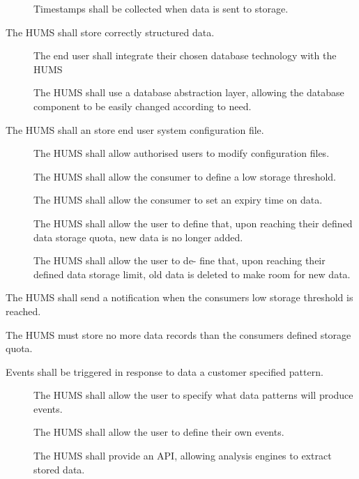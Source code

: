 \begin{description}
\begin{description}
 		 \item[] Timestamps shall be collected when data is sent 	
		to storage.
	\end{description}
	 \item[\fr{3}] The HUMS shall store correctly structured data.
	 \begin{description}
	 	\item[] The end user shall integrate their chosen database 
			technology with the HUMS
	 	\item[] The HUMS shall use a database abstraction layer, 
			allowing the database component to be easily changed 
according to 			need.
	  \end{description}
	 \item[\fr{4}] The HUMS shall an store end user system configuration 
			file.
	 \begin{description}
	  	\item[] The HUMS shall allow authorised users to modify
 		configuration files. 
		 \item[] The HUMS shall allow the consumer to define a 	
			low storage threshold.
		  \item[] The HUMS shall allow the consumer to set an 
			expiry time on data.
		  \item[]  The HUMS shall allow the user to define that, 	
			upon reaching their defined data storage quota, new data is 
			no longer added.
		 \item[] The HUMS shall allow the user to de- fine that, 
			upon reaching their defined data storage limit, old data is 
			deleted to 	make room for new data.
	\end{description}
	 \item[\fr{5}] The HUMS shall send a notification when the consumers 
		low storage threshold is reached.
	  \item[\fr{6}] The HUMS must store no more data records than the 	
		consumers defined storage quota.
	\item[\fr{7}]Events shall be triggered in response to data a customer 	
		specified pattern.
		  \begin{description}
			 \item[]  The HUMS shall allow the user to specify 	
			what data patterns will produce events.
			 \item[] The HUMS shall allow the user to define their
 			own events.
		
 			\item[] The HUMS shall provide an API, 			
			allowing analysis engines to extract stored data.
		

\end{description}
\end{description}
